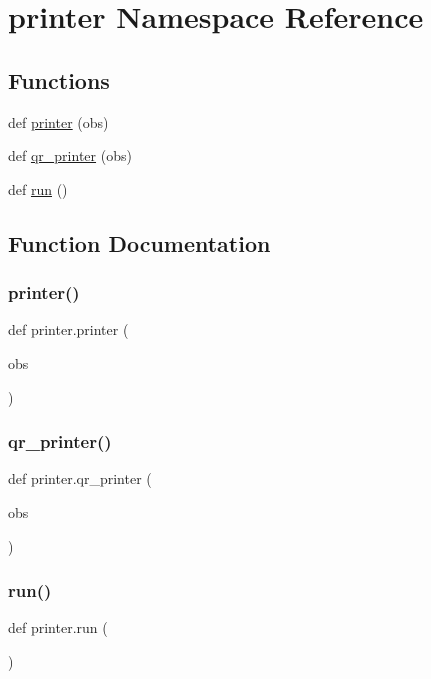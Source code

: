 \hypertarget{namespaceprinter}{}\section{printer Namespace Reference}
\label{namespaceprinter}
\subsection*{Functions}
\begin{DoxyCompactItemize}
\item 
def \hyperlink{namespaceprinter_a3eb27980abedac28745fb43f61bfe198}{printer} (obs)
\item 
def \hyperlink{namespaceprinter_a51a5414aeb2e019bec642be0e96f0c70}{qr\+\_\+printer} (obs)
\item 
def \hyperlink{namespaceprinter_abd8f2589552090a9b3b5f2cd1f941b8b}{run} ()
\end{DoxyCompactItemize}


\subsection{Function Documentation}
\mbox{\label{namespaceprinter_a3eb27980abedac28745fb43f61bfe198}} 
\subsubsection{\texorpdfstring{printer()}{printer()}}
{\footnotesize\ttfamily def printer.\+printer (\begin{DoxyParamCaption}\item[{}]{obs }\end{DoxyParamCaption})}

\mbox{\label{namespaceprinter_a51a5414aeb2e019bec642be0e96f0c70}} 
\subsubsection{\texorpdfstring{qr\+\_\+printer()}{qr\_printer()}}
{\footnotesize\ttfamily def printer.\+qr\+\_\+printer (\begin{DoxyParamCaption}\item[{}]{obs }\end{DoxyParamCaption})}

\mbox{\label{namespaceprinter_abd8f2589552090a9b3b5f2cd1f941b8b}} 
\subsubsection{\texorpdfstring{run()}{run()}}
{\footnotesize\ttfamily def printer.\+run (\begin{DoxyParamCaption}{ }\end{DoxyParamCaption})}

